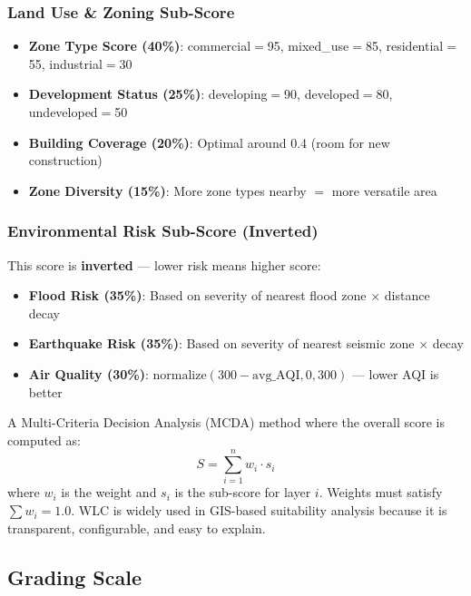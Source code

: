 \documentclass[12pt, a4paper]{article}
\begin{document}
\subsubsection{Land Use \& Zoning Sub-Score}

\begin{itemize}[leftmargin=2em]
    \item \textbf{Zone Type Score (40\%)}: commercial$=$95, mixed\_use$=$85, residential$=$55, industrial$=$30
    \item \textbf{Development Status (25\%)}: developing$=$90, developed$=$80, undeveloped$=$50
    \item \textbf{Building Coverage (20\%)}: Optimal around 0.4 (room for new construction)
    \item \textbf{Zone Diversity (15\%)}: More zone types nearby $=$ more versatile area
\end{itemize}

\subsubsection{Environmental Risk Sub-Score (Inverted)}

This score is \textbf{inverted} — lower risk means higher score:

\begin{itemize}[leftmargin=2em]
    \item \textbf{Flood Risk (35\%)}: Based on severity of nearest flood zone $\times$ distance decay
    \item \textbf{Earthquake Risk (35\%)}: Based on severity of nearest seismic zone $\times$ decay
    \item \textbf{Air Quality (30\%)}: $\text{normalize}(300 - \text{avg\_AQI}, 0, 300)$ — lower AQI is better
\end{itemize}

\begin{conceptbox}
    A Multi-Criteria Decision Analysis (MCDA) method where the overall score is
    computed as:
    \[
        S = \sum_{i=1}^{n} w_i \cdot s_i
    \]
    where $w_i$ is the weight and $s_i$ is the sub-score for layer $i$.
    Weights must satisfy $\sum w_i = 1.0$. WLC is widely used in GIS-based
    suitability analysis because it is transparent, configurable, and easy to explain.
\end{conceptbox}

\subsection{Grading Scale}
\end{document}
